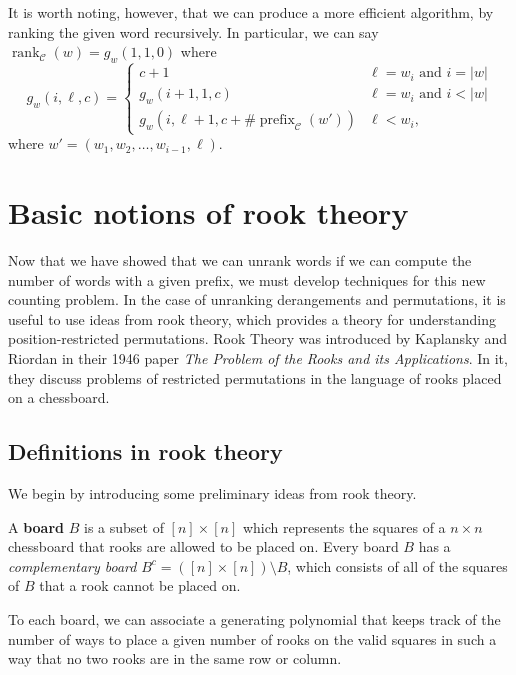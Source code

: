 It is worth noting, however, that we can produce a more efficient algorithm,
by ranking the given word recursively.
In particular, we can say
${\operatorname{rank}_\mathcal{C}(w) = g_w(1,1,0)}$ where
\begin{equation}
  g_w(i, \ell, c) = \begin{cases}
    c + 1 & \ell = w_i \text{ and } i = |w| \\
    g_w(i + 1, 1, c) & \ell = w_i \text{ and } i < |w| \\
    g_w(i, \ell + 1, c + \#\operatorname{prefix}_\mathcal{C}(w')) & \ell < w_i,
  \end{cases}
\end{equation}
where $w' = (w_1, w_2, \dots, w_{i-1}, \ell)$.

\section{Basic notions of rook theory}
Now that we have showed that we can unrank words if we can compute the number of
words with a given prefix, we must develop techniques for this new counting
problem.
In the case of unranking derangements and permutations, it is useful to use
ideas from rook theory, which provides a theory for understanding
position-restricted permutations.
Rook Theory was introduced by Kaplansky and Riordan \cite{Kaplansky1946}
in their 1946 paper \textit{The Problem of the Rooks and its Applications}. In
it, they discuss problems of restricted permutations in the language of rooks
placed on a chessboard.



\subsection{Definitions in rook theory}
We begin by introducing some preliminary ideas from rook theory.

\begin{definition}
  A \textbf{board} $B$ is a subset of $[n] \times [n]$ which represents the
  squares of a $n \times n$ chessboard that rooks are allowed to be placed on.
  Every board $B$ has a \textit{complementary board}
  $B^c = ([n] \times [n]) \setminus B$, which consists of all of the
  squares of $B$ that a rook cannot be placed on.
\end{definition}

To each board, we can associate a generating polynomial that keeps track of the
number of ways to place a given number of rooks on the valid squares in such a
way that no two rooks are in the same row or column.


